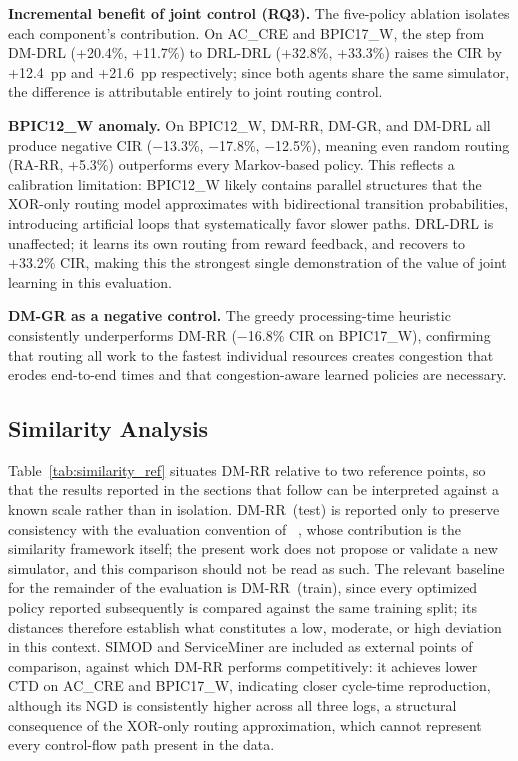 \documentclass[journal,onecolumn]{IEEEtran}
\begin{document}
\noindent\textbf{Incremental benefit of joint control (RQ3).}
The five-policy ablation isolates each component's contribution.
On AC\_CRE and BPIC17\_W, the step from DM-DRL (+20.4\%, +11.7\%)
to DRL-DRL (+32.8\%, +33.3\%) raises the CIR by +12.4~pp and
+21.6~pp respectively; since both agents share the same simulator,
the difference is attributable entirely to joint routing control.

\noindent\textbf{BPIC12\_W anomaly.}
On BPIC12\_W, DM-RR, DM-GR, and DM-DRL all produce negative CIR
($-$13.3\%, $-$17.8\%, $-$12.5\%), meaning even random routing
(RA-RR, +5.3\%) outperforms every Markov-based policy.
This reflects a calibration limitation: BPIC12\_W likely contains
parallel structures that the XOR-only routing model approximates
with bidirectional transition probabilities, introducing artificial
loops that systematically favor slower paths.
DRL-DRL is unaffected; it learns its own routing from reward
feedback, and recovers to +33.2\% CIR, making this the strongest
single demonstration of the value of joint learning in this
evaluation.

\noindent\textbf{DM-GR as a negative control.}
The greedy processing-time heuristic consistently underperforms
DM-RR ($-$16.8\% CIR on BPIC17\_W), confirming that routing all
work to the fastest individual resources creates congestion that
erodes end-to-end times and that congestion-aware learned policies
are necessary.

\subsection{Similarity Analysis}
\label{subsec:similarity}

Table~\ref{tab:similarity_ref} situates DM-RR relative to two
reference points, so that the results reported in the sections that
follow can be interpreted against a known scale rather than in
isolation. DM-RR~(test) is reported only to preserve consistency with
the evaluation convention of
\citeauthor{framework_for_measuring_the_quality_of_business_process_simulation_models}~\cite{framework_for_measuring_the_quality_of_business_process_simulation_models},
whose contribution is the similarity framework itself; the present
work does not propose or validate a new simulator, and this
comparison should not be read as such. The relevant baseline for the
remainder of the evaluation is DM-RR~(train), since every optimized
policy reported subsequently is compared against the same training
split; its distances therefore establish what constitutes a low,
moderate, or high deviation in this context. SIMOD and ServiceMiner
are included as external points of comparison, against which DM-RR
performs competitively: it achieves lower CTD on AC\_CRE and
BPIC17\_W, indicating closer cycle-time reproduction, although its
NGD is consistently higher across all three logs, a structural
consequence of the XOR-only routing approximation, which cannot
represent every control-flow path present in the data.
\end{document}
